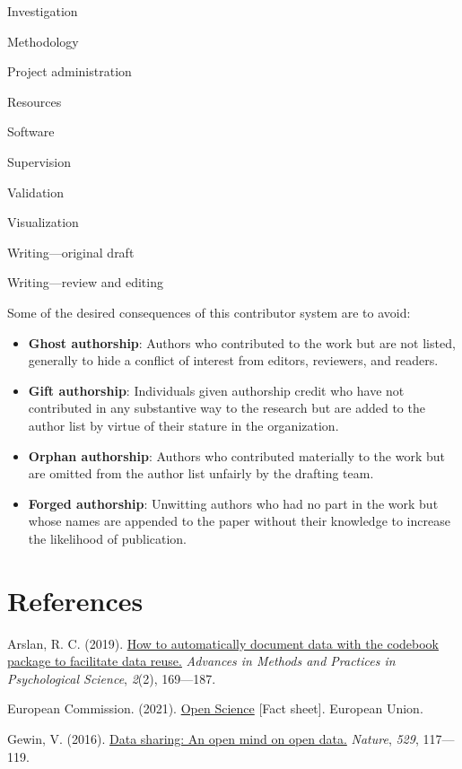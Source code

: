 \documentclass[
]{book}
\theoremstyle{definition}
\theoremstyle{definition}
\theoremstyle{definition}
\theoremstyle{definition}
\theoremstyle{remark}
\begin{document}
Investigation

Methodology

Project administration

Resources

Software

Supervision

Validation

Visualization

Writing---original draft

Writing---review and editing

Some of the desired consequences of this contributor system are to avoid:

\begin{itemize}
\item
  \textbf{Ghost authorship}: Authors who contributed to the work but are not listed, generally to hide a conflict of interest from editors, reviewers, and readers.
\item
  \textbf{Gift authorship}: Individuals given authorship credit who have not contributed in any substantive way to the research but are added to the author list by virtue of their stature in the organization.
\item
  \textbf{Orphan authorship}: Authors who contributed materially to the work but are omitted from the author list unfairly by the drafting team.
\item
  \textbf{Forged authorship}: Unwitting authors who had no part in the work but whose names are appended to the paper without their knowledge to increase the likelihood of publication.
\end{itemize}

\newpage

\hypertarget{references}{%
\section{References}\label{references}}

Arslan, R. C. (2019). \href{https://journals.sagepub.com/doi/10.1177/2515245919838783}{How to automatically document data with the codebook package to facilitate data reuse.} \emph{Advances in Methods and Practices in Psychological Science}, \emph{2}(2), 169---187.

European Commission. (2021). \href{https://research-and-innovation.ec.europa.eu/system/files/2019-12/ec_rtd_factsheet-open-science_2019.pdf}{Open Science} {[}Fact sheet{]}. European Union.

Gewin, V. (2016). \href{https://doi.org/10.1038/nj7584-117a}{Data sharing: An open mind on open data.} \emph{Nature}, \emph{529}, 117---119.
\end{document}

